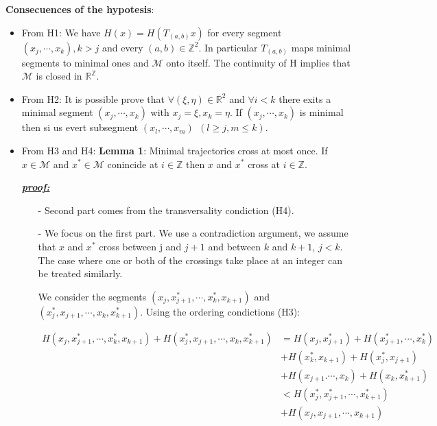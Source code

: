 \documentclass{article}
\begin{document}
 
\noindent \textbf{Consecuences of the hypotesis}:
	\begin{itemize}
		\item From H1: We have $H (x) = H( T_{(a, b)} x)$ for every segment $(x_j, \cdots, x_k), k > j$ and every $(a, b) \in \mathbb{Z}^{2}$. In particular $T_{(a, b)}$ maps minimal segments to minimal ones and $\mathcal{M}$ onto itself. The continuity of H implies that $\mathcal{M}$ is closed in $\mathbb{R}^{\mathbb{Z}}$.
		   
		\item From H2: It is possible prove that $\forall (\xi, \eta) \in \mathbb{R}^{2}$ and $\forall i < k$ there exits a minimal segment $(x_j, \cdots, x_k)$ with $x_j = \xi, x_k = \eta$. If $(x_j, \cdots, x_k)$ is minimal then si us evert subsegment $(x_l, \cdots, x_m) \ \ (l \geq j, m \leq k)$.
		
		\item From H3 and H4: \textbf{Lemma 1}: Minimal trajectories cross at most once. If $x \in \mathcal{M}$ and $x^{*} \in \mathcal{M}$ conincide at $i \in \mathbb{Z}$ then $x$ and $x^{*}$ cross at $i \in \mathbb{Z}$.
		
		\color{blue}
			\noindent \underline{\textbf{\textit{proof:}}} 		
			
			\begin{itemize}
				\item[-] Second part comes from the transversality condiction (H4).
				\item[-] We focus on the first part. We use a contradiction argument, we assume that $x$ and $x^{*}$ cross between j and $j + 1$ and between $k$ and $k + 1$, $j < k$. The case where one or both of the crossings take place at an integer can be treated similarly. 
				
				We consider the segments $(x_j, x_{j + 1}^{*}, \cdots, x_{k}^{*}, x_{k + 1})$ and $(x_{j}^{*}, x_{j + 1}, \cdots, x_{k}, x_{k + 1}^{*})$. Using the ordering condictions (H3):
				
				\begin{equation*}
					\begin{split}
						H (x_j, x_{j + 1}^{*}, \cdots, x_{k}^{*}, x_{k + 1}) + H (x_{j}^{*}, x_{j + 1}, \cdots, x_{k}, x_{k + 1}^{*}) &= H(x_j, x_{j + 1}^{*} ) + H (x_{j + 1}^{*}, \cdots, x_{k}^{*}) \\
						&+ H ( x_{k}^{*}, x_{k + 1} ) + H (x_{j}^{*}, x_{j + 1})  \\
						&+ H (x_{j + 1}. \cdots, x_k) + H( x_{k}, x_{k + 1}^{*}) \\
						&< H( x_{j}^{*}, x_{j + 1}^{*}, \cdots, x_{k + 1}^{*} ) \\
						&+ H(x_j, x_{j + 1}, \cdots, x_{k + 1})
					\end{split}
				\end{equation*}	
				

\end{itemize}
\end{itemize}
\end{document}
